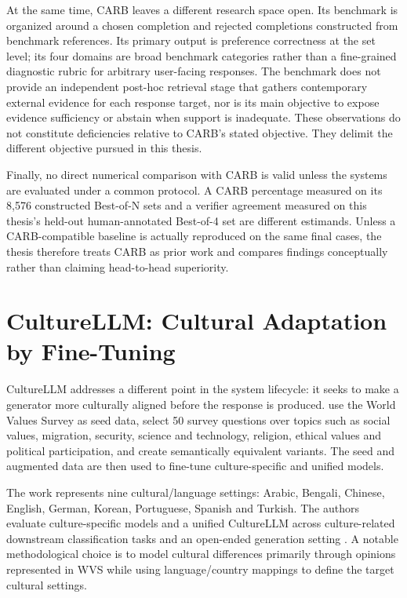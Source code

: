 At the same time, CARB leaves a different research space open. Its benchmark is organized around a chosen completion and rejected completions constructed from benchmark references. Its primary output is preference correctness at the set level; its four domains are broad benchmark categories rather than a fine-grained diagnostic rubric for arbitrary user-facing responses. The benchmark does not provide an independent post-hoc retrieval stage that gathers contemporary external evidence for each response target, nor is its main objective to expose evidence sufficiency or abstain when support is inadequate. These observations do not constitute deficiencies relative to CARB's stated objective. They delimit the different objective pursued in this thesis.

Finally, no direct numerical comparison with CARB is valid unless the systems are evaluated under a common protocol. A CARB percentage measured on its 8,576 constructed Best-of-N sets and a verifier agreement measured on this thesis's held-out human-annotated Best-of-4 set are different estimands. Unless a CARB-compatible baseline is actually reproduced on the same final cases, the thesis therefore treats CARB as prior work and compares findings conceptually rather than claiming head-to-head superiority.

\section{CultureLLM: Cultural Adaptation by Fine-Tuning}

CultureLLM addresses a different point in the system lifecycle: it seeks to make a generator more culturally aligned before the response is produced. \textcite{li2024culturellm} use the World Values Survey as seed data, select 50 survey questions over topics such as social values, migration, security, science and technology, religion, ethical values and political participation, and create semantically equivalent variants. The seed and augmented data are then used to fine-tune culture-specific and unified models.

The work represents nine cultural/language settings: Arabic, Bengali, Chinese, English, German, Korean, Portuguese, Spanish and Turkish. The authors evaluate culture-specific models and a unified CultureLLM across culture-related downstream classification tasks and an open-ended generation setting \parencite{li2024culturellm}. A notable methodological choice is to model cultural differences primarily through opinions represented in WVS while using language/country mappings to define the target cultural settings.

